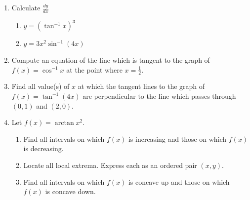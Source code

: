 \documentclass[12pt]{article}
\newif\ifans
\begin{document}
\begin{enumerate}
\begin{enumerate}
\ifans{\fbox{$\lim_{h \rightarrow 0}{\frac{\sin^{-1}{\left(\frac{\sqrt{3}}{2}+h\right)}-\frac{\pi}{3}}{h}}=\left.\frac{d}{dx}(\sin^{-1}{(x)}\right|_{x=\frac{\sqrt{3}}{2}}=\left.\frac{1}{\sqrt{1-x^2}}\right|_{x=\frac{\sqrt{3}}{2}}=2$}} \fi

\end{enumerate}

\item Calculate $\frac{dy}{dx}$

\begin{enumerate}

\item $y=\left(\tan^{-1}x\right)^3$

\ifans\fbox{$\frac{3\left(\tan^{-1}x\right)^2}{1+x^2}$}\fi

\item $y=3x^2\sin^{-1}(4x)$

\ifans\fbox{$\frac{12x^2}{\sqrt{1-16x^2}}+6x\sin^{-1}(4x)$} \fi

\end{enumerate}

\item Compute an equation of the line which is tangent to the graph of $f(x)=\cos^{-1}{x}$ at the point where $x=\frac{1}{2}$.

\ifans{\fbox{$y=-\frac{2}{\sqrt{3}}x+\frac{\pi+\sqrt{3}}{3}$}} \fi

\item Find all value(s) of $x$ at which the tangent lines to the graph of $f(x)=\tan^{-1}{(4x)}$ are perpendicular to the line which passes through $(0,1)$ and $(2,0)$.

\ifans{\fbox{$x=\pm\frac{1}{4}$}} \fi

\item Let $f(x)=\arctan{x^2}$.

\begin{enumerate}

\item Find all intervals on which $f(x)$ is increasing and those on which $f(x)$ is decreasing.

\ifans\fbox{Decreasing on $(-\infty,0)$; Increasing on $(0,\infty)$} \fi

\item Locate all local extrema.  Express each as an ordered pair $(x,y)$.

\ifans\fbox{Local minimum at $(0,0)$; No local maximum} \fi

\item Find all intervals on which $f(x)$ is concave up and those on which $f(x)$ is concave down.


\end{enumerate}
\end{enumerate}
\end{document}
